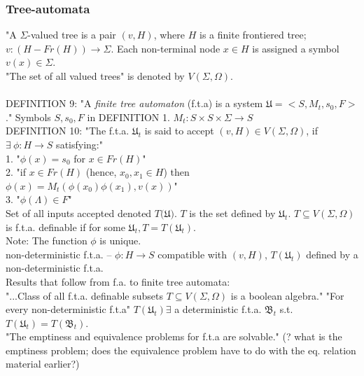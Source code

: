 \subsubsection{Tree-automata}
"A $\Sigma$-valued tree is a pair $(v, H)$, where $H$ is a finite frontiered tree; $v: (H-Fr(H)) \to \Sigma$. Each non-terminal node $x \in H$ is assigned a symbol $v(x) \in \Sigma$.\\
"The set of all valued trees" is denoted by $V(\Sigma, \Omega)$.\\
\\
DEFINITION 9: "A \textit{finite tree automaton} (f.t.a) is a system $\mathfrak{U} = < S,M_t, s_0, F >$." Symbols $S, s_0, F$ in DEFINITION 1.  $M_t : S \times S \times \Sigma \to S$\\
DEFINITION 10: "The f.t.a. $\mathfrak{U}_t$ is said to accept $(v, H) \in V(\Sigma, \Omega)$, if $\exists \ \phi : H \to S$ satisfying:"\\
1. "$\phi(x) = s_0$ for $x \in Fr(H)$"\\
2. "if $x \in Fr(H)$ (hence, $x_0, x_1 \in H$) then $\phi(x) = M_t (\phi(x_0) \phi(x_1), v(x))$"\\
3. "$\phi(\Lambda) \in F$"\\
Set of all inputs accepted denoted $T(\mathfrak{U)}$.  $T$ is the set defined by $\mathfrak{U}_t$.  $T \subseteq V(\Sigma, \Omega)$ is f.t.a. definable if for some $\mathfrak{U}_t, T = T(\mathfrak{U}_t)$.\\
Note: The function $\phi$ is unique.\\
non-deterministic f.t.a. -- $\phi : H \to S$ compatible with $(v,H)$, $T(\mathfrak{U}_t)$ defined by a non-deterministic f.t.a.\\
Results that follow from f.a. to finite tree automata:\\
"...Class of all f.t.a. definable subsets $T \subseteq V(\Sigma, \Omega)$ is a boolean algebra." 
"For every non-deterministic f.t.a" $T(\mathfrak{U}_t) \exists$ a deterministic f.t.a. $\mathfrak{B}_t$ s.t. $T(\mathfrak{U}_t) = T(\mathfrak{B}_t)$.\\
"The emptiness and equivalence problems for f.t.a are solvable." (? what is the emptiness problem; does the equivalence problem have to do with the eq. relation material earlier?)

\newpage

